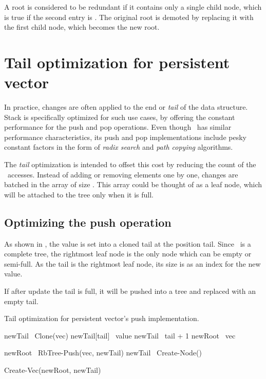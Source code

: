 A root is considered to be redundant if it contains only a single child node, which is true if the second entry is \nil{}.  The original root is demoted by replacing it with the first child node, which becomes the new root. 

\section{Tail optimization for persistent vector}

In practice, changes are often applied to the end or \emph{tail} of the data structure. Stack is specifically optimized for such use cases, by offering the constant performance for the push and pop operations. Even though \rbtree\ has similar performance characteristics, its push and pop implementations include pesky constant factors in the form of \emph{radix search} and \emph{path copying} algorithms. 

The \emph{tail} optimization is intended to offset this cost by reducing the count of the \rbtree\ accesses. Instead of adding or removing elements one by one, changes are batched in the array of size \m. This array could be thought of as a leaf node, which will be attached to the tree only when it is full. 

\subsection*{Optimizing the push operation}
As shown in , the value is set into a cloned tail at the position tail. Since \rbtree\ is a complete tree, the rightmost leaf node is the only node which can be empty or semi-full. As the tail is the rightmost leaf node, its size is as an index for the new value.

If after update the tail is full, it will be pushed into a tree and replaced with an empty tail. 

\begin{listing}[ht!]        
    \caption{Tail optimization for persistent vector’s push implementation.}
    \label{lst:pvec-push}
    
    \begin{algorithmic}
        \State newTail \la\ Clone(vec)
        \State newTail[tail] \la\ value
        \State newTail \la\ tail + 1
        \State newRoot \la\ vec
            
            \State newRoot \la\ RbTree-Push(vec, newTail)
            \State newTail \la\ Create-Node()
        \EndIf
        
        \State \Return Create-Vec(newRoot, newTail)
        \EndFunction
    \end{algorithmic}
\end{listing}


